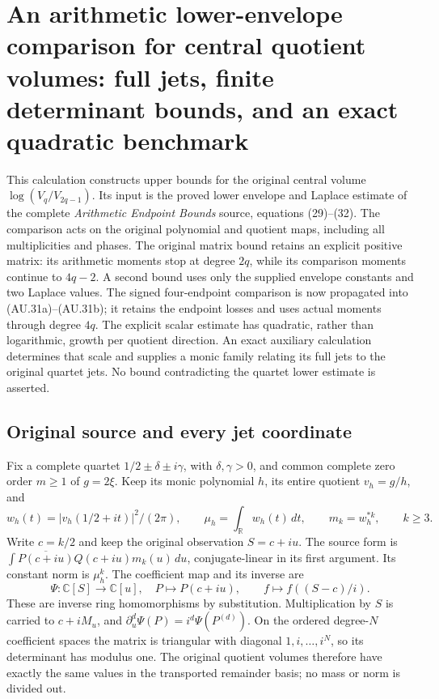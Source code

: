 \begingroup
\def\C{\mathbb C}
\def\R{\mathbb R}
\def\Tr{\operatorname{Tr}}
\def\diag{\operatorname{diag}}
\section{An arithmetic lower-envelope comparison for central quotient volumes: full jets, finite determinant bounds, and an exact quadratic benchmark}



This calculation constructs upper bounds for the original central volume
$\log(V_q/V_{2q-1})$. Its input is the proved lower envelope and Laplace
estimate of the complete \emph{Arithmetic Endpoint Bounds} source, equations
(29)--(32). The comparison acts on the original polynomial and quotient
maps, including all multiplicities and phases. The original matrix
bound retains an explicit positive matrix: its arithmetic moments stop at
degree $2q$, while its comparison moments continue to $4q-2$. A second
bound uses only the supplied envelope constants and two Laplace values.
The signed four-endpoint comparison is now propagated into (AU.31a)--(AU.31b);
it retains the endpoint losses and uses actual moments through degree $4q$.
The explicit scalar estimate has quadratic, rather than logarithmic,
growth per quotient direction. An exact auxiliary calculation determines
that scale and supplies a monic family relating its full jets to the
original quartet jets. No bound contradicting the quartet lower estimate
is asserted.

\subsection{Original source and every jet coordinate}

Fix a complete quartet $1/2\pm\delta\pm i\gamma$, with
$\delta,\gamma>0$, and common complete zero order $m\ge1$ of $g=2\xi$.
Keep its monic polynomial $h$, its entire quotient $v_h=g/h$, and
\[
 w_h(t)=|v_h(1/2+it)|^2/(2\pi),\qquad
 \mu_h=\int_\R w_h(t)\,dt,\qquad m_k=w_h^{*k},\qquad k\ge3.
 \tag{AU.1}
\]
Write $c=k/2$ and keep the original observation $S=c+iu$. The source
form is $\int\overline{P(c+iu)}Q(c+iu)m_k(u)\,du$, conjugate-linear
in its first argument. Its constant norm is $\mu_h^k$.
The coefficient map and its inverse are
\[
 \Psi:\C[S]\longrightarrow\C[u],\quad P\longmapsto P(c+iu),
 \qquad f\longmapsto f((S-c)/i).                             \tag{AU.2}
\]
These are inverse ring homomorphisms by substitution. Multiplication by
$S$ is carried to $c+iM_u$, and
$\partial_u^d\Psi(P)=i^d\Psi(P^{(d)})$. On the ordered degree-$N$
coefficient spaces the matrix is triangular with diagonal
$1,i,\ldots,i^N$, so its determinant has modulus one. The original
quotient volumes therefore have exactly the same values in the
transported remainder basis; no mass or norm is divided out.

